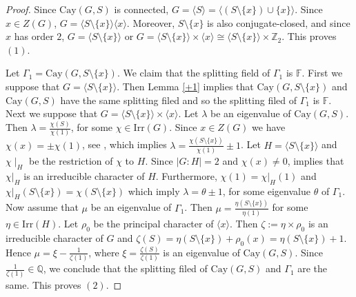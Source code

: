 \documentclass[12pt,a4paper]{article}
\begin{document}
	\begin{proof}
		Since $\mathrm{Cay}(G,S)$ is connected, $G=\langle S\rangle=\langle (S\setminus\{x\})\cup \{x\}\rangle$. 
		Since $x\in Z(G)$, $G=\langle S\setminus\{x\}\rangle \langle x\rangle$. 
		Moreover, $S\setminus\{x\}$ is also conjugate-closed, and since $x$ has order $2$, $G=\langle S\setminus\{x\}\rangle$ or $G=\langle S\setminus\{x\}\rangle\times\langle x\rangle\cong \langle S\setminus\{x\}\rangle\times\mathbb{Z}_2$. 
		This proves $(1)$.
		
		
		Let $\Gamma_1=\mathrm{Cay}(G, S\setminus\{x\})$. We claim that the splitting field of $\Gamma_1$ is $\mathbb{F}$. 
		First we suppose that $G=\langle S\setminus\{x\}\rangle$.
		Then Lemma \ref{+1} implies that $\mathrm{Cay}(G,S\setminus\{x\})$ and $\mathrm{Cay}(G,S)$ have the same splitting filed and so the splitting filed of $\Gamma_1$ is $\mathbb{F}$. 
		Next we suppose that $G=\langle S\setminus\{x\}\rangle\times\langle x\rangle$.
		Let $\lambda$ be an eigenvalue of $\mathrm{Cay}(G,S)$. 
		Then $\lambda=\frac{\chi(S)}{\chi(1)}$, for some $\chi\in\mathrm{Irr}(G)$. Since $x\in Z(G)$ we have $\chi(x)=\pm\chi(1)$, see \cite[Exrecise 5 of Chapter 13]{JL}, which implies $\lambda=\frac{\chi(S\setminus\{x\})}{\chi(1)}\pm 1$. Let $H=\langle S\setminus\{x\}\rangle$ and $\chi\mid_H$ be the restriction of $\chi$ to $H$. Since $|G:H|=2$ and $\chi(x)\neq 0$, \cite[Proposition 20.5]{JL} implies that
		$\chi|_H$ is an irreducible character of $H$. Furthermore, $\chi(1)=\chi|_H(1)$ and $\chi|_H(S\setminus\{x\})=\chi(S\setminus\{x\})$ which imply $\lambda=\theta\pm 1$, for some eigenvalue $\theta$ of $\Gamma_1$. Now assume that $\mu$ be an eigenvalue of $\Gamma_1$. Then $\mu=\frac{\eta(S\setminus\{x\})}{\eta(1)}$ for some $\eta\in\mathrm{Irr}(H)$. Let $\rho_0$ be the principal character of $\langle x\rangle$. Then $\zeta:=\eta\times\rho_0$ is an irreducible character of $G$ and $\zeta(S)=\eta(S\setminus\{x\})+\rho_0(x)=\eta(S\setminus\{x\})+1$. Hence $\mu=\xi-\frac{1}{\zeta(1)}$, where $\xi=\frac{\zeta(S)}{\zeta(1)}$ is an eigenvalue of $\mathrm{Cay}(G,S)$. Since $\frac{1}{\zeta(1)}\in\mathbb{Q}$, we conclude that the splitting filed of $\mathrm{Cay}(G,S)$ and $\Gamma_1$ are the same.
		This proves $(2)$.
	\end{proof}
	
\end{document}
